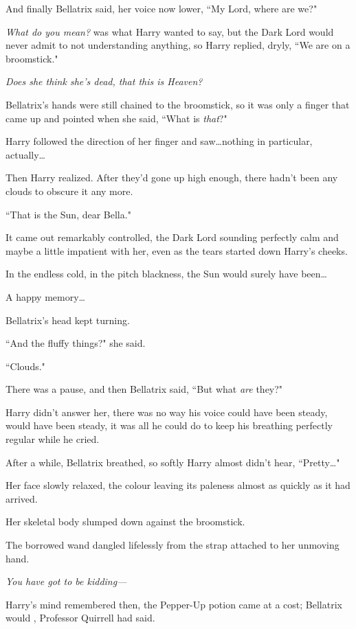 And finally Bellatrix said, her voice now lower, ``My Lord, where are we?"

\emph{What do you mean?} was what Harry wanted to say, but the Dark Lord would never admit to not understanding anything, so Harry replied, dryly, ``We are on a broomstick."

\emph{Does she think she's dead, that this is Heaven?}

Bellatrix's hands were still chained to the broomstick, so it was only a finger that came up and pointed when she said, ``What is \emph{that}?"

Harry followed the direction of her finger and saw…nothing in particular, actually…

Then Harry realized. After they'd gone up high enough, there hadn't been any clouds to obscure it any more.

``That is the Sun, dear Bella."

It came out remarkably controlled, the Dark Lord sounding perfectly calm and maybe a little impatient with her, even as the tears started down Harry's cheeks.

In the endless cold, in the pitch blackness, the Sun would surely have been…

A happy memory…

Bellatrix's head kept turning.

``And the fluffy things?" she said.

``Clouds."

There was a pause, and then Bellatrix said, ``But what \emph{are} they?"

Harry didn't answer her, there was no way his voice could have been steady, would have been steady, it was all he could do to keep his breathing perfectly regular while he cried.

After a while, Bellatrix breathed, so softly Harry almost didn't hear, ``Pretty…"

Her face slowly relaxed, the colour leaving its paleness almost as quickly as it had arrived.

Her skeletal body slumped down against the broomstick.

The borrowed wand dangled lifelessly from the strap attached to her unmoving hand.

\emph{You have \emph{got} to be \emph{kidding}—}

Harry's mind remembered then, the Pepper-Up potion came at a cost; Bellatrix would , Professor Quirrell had said.

